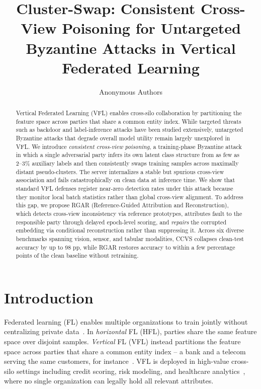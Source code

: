 \documentclass{article}
\title{Cluster-Swap: Consistent Cross-View Poisoning for Untargeted
       Byzantine Attacks in Vertical Federated Learning}
\author{%
  Anonymous Authors
}
\begin{document}
\maketitle

\begin{abstract}
Vertical Federated Learning (VFL) enables cross-silo collaboration by
partitioning the feature space across parties that share a common entity
index.
While targeted threats such as backdoor and label-inference attacks have been
studied extensively, untargeted Byzantine attacks that degrade overall model
utility remain largely unexplored in VFL.
We introduce \emph{consistent cross-view poisoning}, a training-phase
Byzantine attack in which a single adversarial party infers its own latent
class structure from as few as 2--3\% auxiliary labels and then
consistently swaps training samples across maximally distant pseudo-clusters.
The server internalizes a stable but spurious cross-view association and fails
catastrophically on clean data at inference time.
We show that standard VFL defenses register near-zero detection rates under
this attack because they monitor local batch statistics rather than global
cross-view alignment.
To address this gap, we propose RGAR (Reference-Guided Attribution and
Reconstruction), which detects cross-view inconsistency via reference
prototypes, attributes fault to the responsible party through delayed
epoch-level scoring, and \emph{repairs} the corrupted embedding via
conditional reconstruction rather than suppressing it.
Across six diverse benchmarks spanning vision, sensor, and tabular modalities,
CCVS collapses clean-test accuracy by up to 98 pp, while RGAR restores
accuracy to within a few percentage points of the clean baseline without
retraining.
\end{abstract}

\section{Introduction}
\label{sec:intro}

Federated learning (FL) enables multiple organizations to train jointly
without centralizing private data~\citep{mcmahan2017communication}.
In \emph{horizontal} FL (HFL), parties share the same feature space over
disjoint samples.
\emph{Vertical} FL (VFL) instead partitions the feature space across parties
that share a common entity index -- a bank and a telecom serving the same
customers, for instance~\citep{vepakomma2018split}.
VFL is deployed in high-value cross-silo settings including credit scoring,
risk modeling, and healthcare analytics~\citep{yang2019federated}, where no
single organization can legally hold all relevant attributes.
\end{document}
